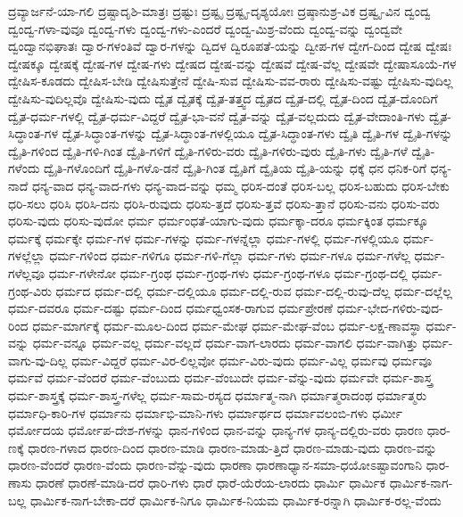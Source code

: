 {ದ್ರವ್ಯಾರ್ಜನೆ-ಯಾ-ಗಲಿ
ದ್ರಷ್ಟಾದೃಶಿ-ಮಾತ್ರಃ
ದ್ರಷ್ಟುಃ
ದ್ರಷ್ಟೃ
ದ್ರಷ್ಟೃ-ದೃಶ್ಯಯೋಃ
ದ್ರಷ್ಠಾನುಶ್ರ-ವಿಕ
ದ್ರಷ್ವೃ-ವಿನ
ದ್ವಂದ್ವ
ದ್ವಂದ್ವ-ಗಳಾ-ವುವೂ
ದ್ವಂದ್ವ-ಗಳು
ದ್ವಂದ್ವ-ಗಳು-ಎಂದರೆ
ದ್ವಂದ್ವ-ಮಿಶ್ರ-ವೆಂದು
ದ್ವಂದ್ವ-ವನ್ನು
ದ್ವಂದ್ವವೇ
ದ್ವಂದ್ವಾನಭಿಘಾತಃ
ದ್ವಾರ-ಗಳಂತಿವೆ
ದ್ವಾರ-ಗಳನ್ನು
ದ್ವಿದಳ
ದ್ವಿರೂಪತೆ-ಯನ್ನು
ದ್ವೀಪ-ಗಳ
ದ್ವೇಗ-ದಿಂದ
ದ್ವೇಷ
ದ್ವೇಷಃ
ದ್ವೇಷಕ್ಕೂ
ದ್ವೇಷಕ್ಕೆ
ದ್ವೇಷ-ಗಳ
ದ್ವೇಷ-ಗಳು
ದ್ವೇಷದ
ದ್ವೇಷ-ವನ್ನು
ದ್ವೇಷವೆ
ದ್ವೇಷ-ವೆಲ್ಲ
ದ್ವೇಷವೇ
ದ್ವೇಷಾಸೂಯೆ-ಗಳ
ದ್ವೇಷಿಸ-ಕೂಡದು
ದ್ವೇಷಿಸ-ಬೇಡಿ
ದ್ವೇಷಿಸುತ್ತೇನೆ
ದ್ವೇಷಿ-ಸುವ
ದ್ವೇಷಿಸು-ವವ-ರಾರು
ದ್ವೇಷಿಸು-ವಷ್ಟು
ದ್ವೇಷಿಸು-ವುದಿಲ್ಲ
ದ್ವೇಷಿಸು-ವುದಿಲ್ಲವೊ
ದ್ವೇಷಿಸು-ವುದು
ದ್ವೈತ
ದ್ವೈತಕ್ಕೆ
ದ್ವೈತ-ತತ್ತ್ವದ
ದ್ವೈತದ
ದ್ವೈತ-ದಲ್ಲಿ
ದ್ವೈತ-ದಿಂದ
ದ್ವೈತ-ದೊಂದಿಗೆ
ದ್ವೈತ-ಧರ್ಮ-ಗಳಲ್ಲಿ
ದ್ವೈತ-ಧರ್ಮ-ವಿದ್ದರೆ
ದ್ವೈತ-ಭಾ-ವನೆ
ದ್ವೈತ-ವನ್ನು
ದ್ವೈತ-ವಲ್ಲದುದು
ದ್ವೈತ-ವೇದಾಂತಿ-ಗಳು
ದ್ವೈತ-ಸಿದ್ಧಾಂತ-ಗಳ
ದ್ವೈತ-ಸಿದ್ಧಾಂತ-ಗಳನ್ನು
ದ್ವೈತ-ಸಿದ್ಧಾಂತ-ಗಳಲ್ಲಿಯೂ
ದ್ವೈತ-ಸಿದ್ಧಾಂತ-ಗಳು
ದ್ವೈತಿ
ದ್ವೈತಿ-ಗಳ
ದ್ವೈತಿ-ಗಳನ್ನು
ದ್ವೈತಿ-ಗಳಿಂದ
ದ್ವೈತಿ-ಗಳಿ-ಗಿಂತ
ದ್ವೈತಿ-ಗಳಿಗೆ
ದ್ವೈತಿ-ಗಳಿರು-ವರು
ದ್ವೈತಿ-ಗಳಿರು-ವುರು
ದ್ವೈತಿ-ಗಳು
ದ್ವೈತಿ-ಗಳೆ
ದ್ವೈತಿ-ಗಳೆಂದು
ದ್ವೈತಿ-ಗಳೊಂದಿಗೆ
ದ್ವೈತಿ-ಗಳೊ-ಡನೆ
ದ್ವೈತಿ-ಗಿಂತ
ದ್ವೈತಿಗೆ
ದ್ವೈತಿಯ
ದ್ವೈತಿ-ಯನ್ನು
ಧಕ್ಕೆ
ಧನ
ಧನಿಕ-ರಿಗೆ
ಧನ್ಯ-ನಾದೆ
ಧನ್ಯ-ವಾದ
ಧನ್ಯ-ವಾದ-ಗಳು
ಧನ್ಯ-ವಾದ-ವನ್ನು
ಧಮ್ಮ
ಧರಿಸ-ದಂತೆ
ಧರಿಸ-ಬಲ್ಲ
ಧರಿಸ-ಬಹುದು
ಧರಿಸ-ಬೇಕು
ಧರಿ-ಸಲು
ಧರಿಸಿ
ಧರಿಸಿ-ದನು
ಧರಿಸಿ-ರುವುದು
ಧರಿಸು-ತ್ತದೆ
ಧರಿಸು-ತ್ತವೆ
ಧರಿಸು-ತ್ತಾನೆ
ಧರಿಸು-ವನು
ಧರಿಸು-ವರು
ಧರಿಸು-ವುದು
ಧರಿಸು-ವುದೋ
ಧರ್ಮ
ಧರ್ಮಂಧತೆ-ಯಾಗು-ವುದು
ಧರ್ಮಕ್ಕಾ-ದರೂ
ಧರ್ಮಕ್ಕಿಂತ
ಧರ್ಮಕ್ಕೂ
ಧರ್ಮಕ್ಕೆ
ಧರ್ಮಕ್ಕೇ
ಧರ್ಮ-ಗಳ
ಧರ್ಮ-ಗಳನ್ನು
ಧರ್ಮ-ಗಳನ್ನೆಲ್ಲಾ
ಧರ್ಮ-ಗಳಲ್ಲಿ
ಧರ್ಮ-ಗಳಲ್ಲಿಯೂ
ಧರ್ಮ-ಗಳಲ್ಲೆಲ್ಲಾ
ಧರ್ಮ-ಗಳಿಂದ
ಧರ್ಮ-ಗಳಿಗೂ
ಧರ್ಮ-ಗಳಿ-ಗೆಲ್ಲಾ
ಧರ್ಮ-ಗಳು
ಧರ್ಮ-ಗಳೂ
ಧರ್ಮ-ಗಳೆಲ್ಲ
ಧರ್ಮ-ಗಳೆಲ್ಲವೂ
ಧರ್ಮ-ಗಳೇನೋ
ಧರ್ಮ-ಗ್ರಂಥ
ಧರ್ಮ-ಗ್ರಂಥ-ಗಳು
ಧರ್ಮ-ಗ್ರಂಥ-ಗಳೂ
ಧರ್ಮ-ಗ್ರಂಥ-ದಲ್ಲಿ
ಧರ್ಮ-ಗ್ರಂಥ-ವಿರು
ಧರ್ಮದ
ಧರ್ಮ-ದಲ್ಲಿ
ಧರ್ಮ-ದಲ್ಲಿಯೂ
ಧರ್ಮ-ದಲ್ಲಿ-ರುವ
ಧರ್ಮ-ದಲ್ಲಿ-ರುವು-ದೆಲ್ಲ
ಧರ್ಮ-ದಲ್ಲೆಲ್ಲ
ಧರ್ಮ-ದವರೂ
ಧರ್ಮ-ದಷ್ಟು
ಧರ್ಮ-ದಿಂದ
ಧರ್ಮಧ್ವಂಸಕ-ರಾಗುವ
ಧರ್ಮಪ್ರೇರಣೆ
ಧರ್ಮ-ಭೇದ-ಗಳಿರು-ವುದ-ರಿಂದ
ಧರ್ಮ-ಮಾರ್ಗಕ್ಕೆ
ಧರ್ಮ-ಮೂಲ-ದಿಂದ
ಧರ್ಮ-ಮೇಘ
ಧರ್ಮ-ಮೇಘ-ವೆಂಬ
ಧರ್ಮ-ಲಕ್ಷ-ಣಾವಸ್ಥಾ
ಧರ್ಮ-ವನ್ನು
ಧರ್ಮ-ವನ್ನೂ
ಧರ್ಮ-ವಲ್ಲ
ಧರ್ಮ-ವಲ್ಲದೆ
ಧರ್ಮ-ವಾಗ-ಲಾರದು
ಧರ್ಮ-ವಾಗಲಿ
ಧರ್ಮ-ವಾಗಿತ್ತು
ಧರ್ಮ-ವಾಗು-ವು-ದಿಲ್ಲ
ಧರ್ಮ-ವಿದ್ದರೆ
ಧರ್ಮ-ವಿರ-ಲಿಲ್ಲವೋ
ಧರ್ಮ-ವಿರು-ವುದು
ಧರ್ಮ-ವಿಲ್ಲ
ಧರ್ಮವು
ಧರ್ಮವೂ
ಧರ್ಮವೆ
ಧರ್ಮ-ವೆಂದರೆ
ಧರ್ಮ-ವೆಂಬುದು
ಧರ್ಮ-ವೆಂಬುದೇ
ಧರ್ಮ-ವೆನ್ನು-ವುದು
ಧರ್ಮವೇ
ಧರ್ಮ-ಶಾಸ್ತ್ರ
ಧರ್ಮ-ಶಾಸ್ತ್ರಕ್ಕೆ
ಧರ್ಮ-ಶಾಸ್ತ್ರ-ಗಳೆಲ್ಲ
ಧರ್ಮ-ಸಾಮ-ರಸ್ಯದ
ಧರ್ಮಾತ್ಮ-ನಾಗಿ
ಧರ್ಮಾತ್ಮರಾದಂಥ
ಧರ್ಮಾತ್ಮರು
ಧರ್ಮಾಧಿ-ಕಾರಿ-ಗಳ
ಧರ್ಮಾನು
ಧರ್ಮಾಭಿ-ಮಾನಿ-ಗಳು
ಧರ್ಮಾರ್ಥದ
ಧರ್ಮಾವಲಂಬಿ-ಗಳು
ಧರ್ಮೀ
ಧರ್ಮೋದಯ
ಧರ್ಮೋಪ-ದೇಶ-ಗಳನ್ನು
ಧಾನ-ಗಳಿಂದ
ಧಾನ-ವನ್ನು
ಧಾನ್ಯ-ಗಳ
ಧಾನ್ಯ-ದಲ್ಲಿರು-ವರು
ಧಾರಣ
ಧಾರ-ಣಕ್ಕೆ
ಧಾರಣ-ಗಳಾದ
ಧಾರಣ-ದಿಂದ
ಧಾರಣ-ಮಾಡಿ
ಧಾರಣ-ಮಾಡು-ತ್ತಿದೆ
ಧಾರಣ-ಮಾಡು-ವುದು
ಧಾರಣ-ವನ್ನು
ಧಾರಣ-ವೆಂದರೆ
ಧಾರಣ-ವೆಂದು
ಧಾರಣ-ವೆನ್ನು-ವುದು
ಧಾರಣಾ
ಧಾರಣಾಧ್ಯಾನ-ಸಮಾ-ಧಯೋಽಷ್ಟಾವಂಗಾನಿ
ಧಾರ-ಣಾಸು
ಧಾರಣೆ
ಧಾರಣೆ-ಮಾಡಿ-ದರೆ
ಧಾರಿ-ಗಳು
ಧಾರೆ
ಧಾರೆ-ಯೆರೆಯ-ಲಾರದು
ಧಾರ್ಮಿ
ಧಾರ್ಮಿಕ
ಧಾರ್ಮಿಕ-ನಾಗ-ಬಲ್ಲ
ಧಾರ್ಮಿಕ-ನಾಗ-ಬೇಕಾ-ದರೆ
ಧಾರ್ಮಿಕ-ನಿಗೂ
ಧಾರ್ಮಿಕ-ನಿಯಮ
ಧಾರ್ಮಿಕ-ರನ್ನಾಗಿ
ಧಾರ್ಮಿಕ-ರಲ್ಲ-ವೆಂದು
}

